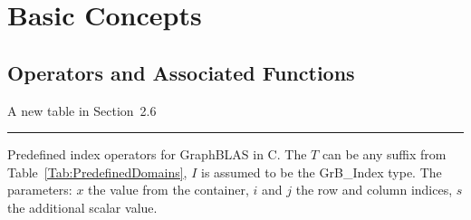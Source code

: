 \chapter{Basic Concepts}
\section{Operators and Associated Functions}

A new table in Section~2.6

\begin{table}[h]
\hspace*{-2.5em}\begin{threeparttable}
\hrule
\caption{Predefined index operators for GraphBLAS in C.  The $T$ can 
be any suffix from Table~\ref{Tab:PredefinedDomains}, $I$ is assumed to be the {\sf GrB\_Index} type.
The parameters: $x$ the value from the container, $i$ and $j$ the row and column indices, $s$ the additional scalar value.}
\vspace{1\baselineskip}


\end{threeparttable}
\end{table}
